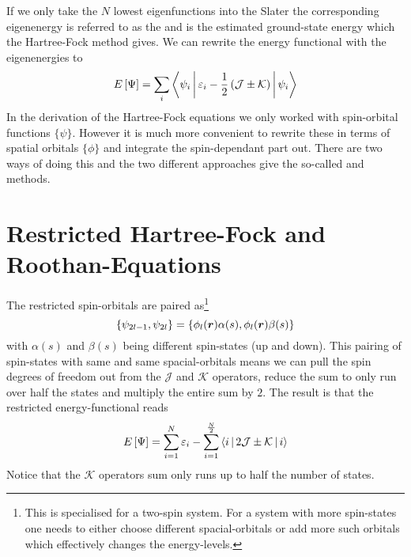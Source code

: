         If we only take the $N$ lowest eigenfunctions into the Slater the
        corresponding eigenenergy is referred to as the  and is the estimated ground-state energy which the Hartree-Fock
        method gives. We can rewrite the energy functional with the
        eigenenergies to
            \begin{equation}
                E\left[\Psi\right] = \sum_i\Braket{\psi_i | \varepsilon_i -
                \frac{1}{2}\left(\mathcal{J} \pm \mathcal{K}\right) | \psi_i}
            \end{equation}
        In the derivation of the Hartree-Fock equations we only worked with
        spin-orbital functions $\{\psi\}$. However it is much more convenient
        to rewrite these in terms of spatial orbitals $\{\phi\}$ and integrate
        the spin-dependant part out. There are two ways of doing this and the
        two different approaches give the so-called  and  methods.

    \section{Restricted Hartree-Fock and Roothan-Equations}
        The restricted spin-orbitals are paired as\footnote{This is specialised
        for a two-spin system. For a system with more spin-states one needs to
        either choose different spacial-orbitals or add more such orbitals
        which effectively changes the energy-levels.}
            \begin{equation}
                \{\psi_{2l-1}, \psi_{2l}\} =
                \{\phi_l(\boldsymbol{{r}})\alpha(s),\phi_l(\boldsymbol{{r}})\beta(s)\}
            \end{equation}
        with $\alpha(s)$ and $\beta(s)$ being different spin-states (up and
        down). This pairing of spin-states with same and same spacial-orbitals
        means we can pull the spin degrees of freedom out from the
        $\mathcal{J}$ and $\mathcal{K}$ operators, reduce the sum to only run
        over half the states and multiply the entire sum by $2$. The result is
        that the restricted energy-functional reads
            \begin{equation}
                E\left[\Psi\right] = \sum\limits^N_{i=1}\varepsilon_i -
                \sum\limits^{\frac{N}{2}}_{i=1} \Braket{i | 2\mathcal{J}
                \pm \mathcal{K} | i}
            \end{equation}
        Notice that the $\mathcal{K}$ operators sum only runs up to half the
        number of states.
        
